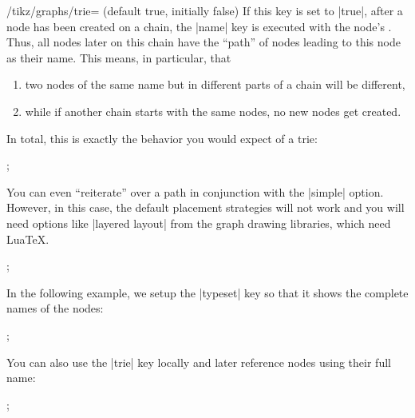 \begin{key}{/tikz/graphs/trie= (default true, initially false)}
    If this key is set to |true|, after a node has been created on a chain, the
    |name| key is executed with the node's . Thus, all nodes
    later on this chain have the ``path'' of nodes leading to this node as
    their name. This means, in particular, that
    \begin{enumerate}
        \item two nodes of the same name but in different parts of a chain will
            be different,
        \item while if another chain starts with the same nodes, no new nodes
            get created.
    \end{enumerate}
    In total, this is exactly the behavior you would expect of a trie:
\begin{codeexample}[preamble={\usetikzlibrary{graphs}}]
\tikz {};
\end{codeexample}
    You can even ``reiterate'' over a path in conjunction with the |simple|
    option. However, in this case, the default placement strategies will not
    work and you will need options like |layered layout| from the graph drawing
    libraries, which need Lua\TeX.
\ifluatex
\begin{codeexample}[preamble={\usetikzlibrary{graphs,graphdrawing}\usegdlibrary{layered}}]
\tikz {};
\end{codeexample}
    In the following example, we setup the |typeset| key so that it shows the
    complete names of the nodes:
\begin{codeexample}[preamble={\usetikzlibrary{graphs,graphdrawing}\usegdlibrary{layered}}]
\tikz {};
\end{codeexample}
\fi
    You can also use the |trie| key locally and later reference nodes using
    their full name:
\begin{codeexample}[preamble={\usetikzlibrary{graphs}}]
\tikz {};
\end{codeexample}
\end{key}


